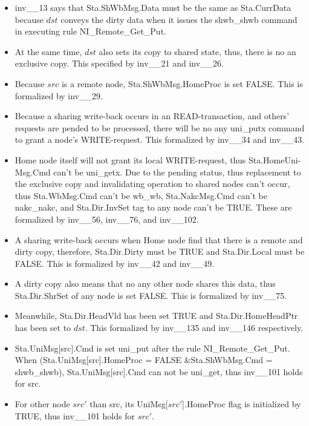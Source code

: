 \documentclass{llncs}
\begin{document}
\begin{itemize}
\item inv\_\_13 says that Sta.ShWbMsg.Data must be the same as Sta.CurrData because $dst$ conveys the dirty data when it issues the  shwb\_shwb command in executing rule NI\_Remote\_Get\_Put.
\item At the same time, $dst$ also sets its copy to shared state, thus, there is no an exclusive copy. This specified by inv\_\_21 and inv\_\_26.
\item Because   $src$ is a remote node, Sta.ShWbMsg.HomeProc is set FALSE. This is formalized by inv\_\_29.
\item Because  a sharing write-back occurs in an READ-transaction, and others' requests are pended to be processed, there will be no any uni\_putx command  to grant a node's WRITE-request. This formalized by inv\_\_34 and inv\_\_43.
\item Home node itself will not grant its local WRITE-request, thus Sta.HomeUni-Msg.Cmd  can't be  uni\_getx. Due to the pending status, thus replacement to the exclusive copy and invalidating operation to shared nodes can't occur, thus Sta.WbMsg.Cmd can't be wb\_wb, Sta.NakcMsg.Cmd can't be nakc\_nakc, and Sta.Dir.InvSet tag to any node can't be TRUE. These are formalized by inv\_\_56, inv\_\_76, and inv\_\_102.
\item A sharing write-back occurs when Home node find that there is a remote and dirty copy, therefore, Sta.Dir.Dirty must be TRUE and Sta.Dir.Local must be FALSE. This is formalized by inv\_\_42 and inv\_\_49.
\item A dirty copy also means that no any other node shares this data, thus Sta.Dir.ShrSet of any node is set FALSE. This is formalized by inv\_\_75.
\item Meanwhile, Sta.Dir.HeadVld has been set TRUE and Sta.Dir.HomeHeadPtr has been set to $dst$. This formalized by inv\_\_135 and inv\_\_146 respectively.
\item Sta.UniMsg[src].Cmd  is set uni\_put after the rule NI\_Remote\_Get\_Put. When (Sta.UniMsg[src].HomeProc = FALSE \&Sta.ShWbMsg.Cmd = shwb\_shwb), Sta.UniMsg[src].Cmd can not be uni\_get, thus inv\_\_101 holds for src.
\item For other node $src'$ than src, its UniMsg[$src'$].HomeProc flag is initialized by TRUE,  thus inv\_\_101 holds for $src'$.
\end{itemize}
\end{document}
